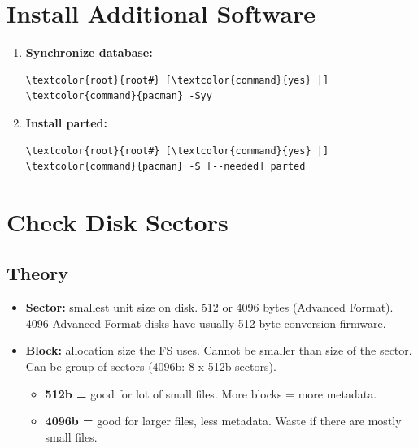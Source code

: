 \documentclass[10pt, a4paper, onecolumn, oneside, titlepage, openany]{book}
\begin{document}
\section{Install Additional Software}
\begin{enumerate}
    \item \textbf{Synchronize database:}
\begin{Verbatim}[commandchars=\\\{\}]
\textcolor{root}{root#} [\textcolor{command}{yes} |] \textcolor{command}{pacman} -Syy
\end{Verbatim}
    \item \textbf{Install parted:}
\begin{Verbatim}[commandchars=\\\{\}]
\textcolor{root}{root#} [\textcolor{command}{yes} |] \textcolor{command}{pacman} -S [--needed] parted
\end{Verbatim}
\end{enumerate}

\section{Check Disk Sectors}
\subsection{Theory}
\begin{itemize}
    \item \textbf{Sector:} smallest unit size on disk. 512 or 4096 bytes (Advanced Format). 4096 Advanced Format disks have usually 512-byte conversion firmware.
    \item \textbf{Block:} allocation size the FS uses. Cannot be smaller than size of the sector. Can be group of sectors (4096b: 8 x 512b sectors).
    \begin{itemize}
        \item \textbf{512b =} good for lot of small files. More blocks = more metadata.
        \item \textbf{4096b =}  good for larger files, less metadata. Waste if there are mostly small files.
    \end{itemize}
\end{itemize}
\end{document}
